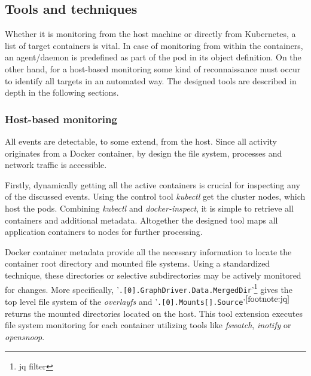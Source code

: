 \subsection{Tools and techniques \label{design:mon:tools}}
Whether it is monitoring from the host machine or directly from Kubernetes, a list of target containers is vital. In case of monitoring from within the containers, an agent/daemon is predefined as part of the pod in its object definition. On the other hand, for a host-based monitoring some kind of reconnaissance must occur to identify all targets in an automated way. The designed tools are described in depth in the following sections.

\subsubsection*{Host-based monitoring \label{design:mon:tools:host}}
All events are detectable, to some extend, from the host. Since all activity originates from a Docker container, by design the file system, processes and network traffic is accessible.

Firstly, dynamically getting all the active containers is crucial for inspecting any of the discussed events. Using the control tool \textit{kubectl} get the cluster nodes, which host the pods. Combining \textit{kubectl} and \textit{docker-inspect}, it is simple to retrieve all containers and additional metadata. Altogether the designed tool maps all application containers to nodes for further processing.

Docker container metadata provide all the necessary information to locate the container root directory and mounted file systems. Using a standardized technique, these directories or selective subdirectories may be actively monitored for changes. More specifically, '\texttt{.[0].GraphDriver.Data.MergedDir}'\footnote{\label{footnote:jq}jq filter} gives the top level file system of the \textit{overlayfs} and '\texttt{.[0].Mounts[].Source}'$^{\ref{footnote:jq}}$ returns the mounted directories located on the host. This tool extension executes file system monitoring for each container utilizing tools like \textit{fswatch}, \textit{inotify} or \textit{opensnoop}.

